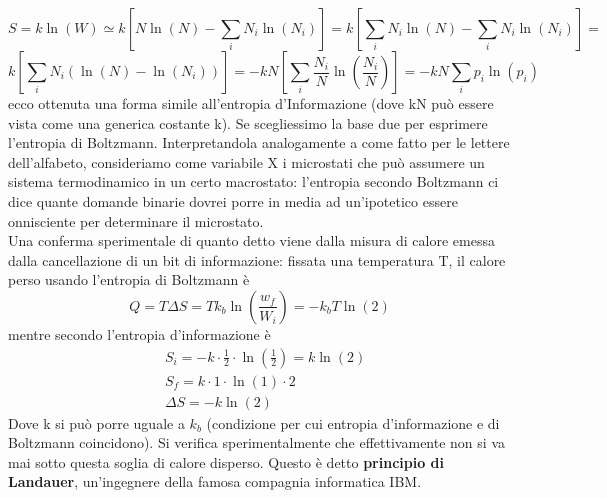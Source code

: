 \documentclass[
10pt, %
a4paper, %
oneside, %
headinclude,footinclude, %
BCOR5mm, %
]{scrartcl}
\begin{document}
\[S = k\ln(W)\simeq k[N\ln(N)-\sum_iN_i\ln(N_i)]=k\left[\sum_iN_i\ln(N)-\sum_iN_i\ln(N_i)\right]=\]
\[k\left[\sum_iN_i\left(\ln(N)-\ln(N_i)\right)\right]=-kN\left[\sum_i\frac{N_i}{N}\ln\left(\frac{N_i}{N}\right)\right] =-kN\sum_ip_i\ln(p_i)\]
ecco ottenuta una forma simile all'entropia d'Informazione (dove kN può essere vista come una generica costante k). Se scegliessimo la base due per esprimere l'entropia di Boltzmann. Interpretandola analogamente a come fatto per le lettere dell'alfabeto, consideriamo come variabile X i microstati che può assumere un sistema termodinamico in un certo macrostato: l'entropia secondo Boltzmann ci dice quante domande binarie dovrei porre in media ad un'ipotetico essere onnisciente per determinare il microstato.\\
 Una conferma sperimentale di quanto detto viene dalla misura di calore emessa dalla cancellazione di un bit di informazione: fissata una temperatura T, il calore perso usando l'entropia di Boltzmann è
\[Q = T\Delta S = T k_b \ln\left(\frac{w_f}{W_i}\right) = -k_bT\ln(2)\]
mentre secondo l'entropia d'informazione è
\begin{align*}
	&S_i =-k\cdot \frac{1}{2}\cdot \ln\left(\frac{1}{2}\right)=k\ln(2)\\
	&S_f=k\cdot 1 \cdot \ln(1)\cdot 2\\
	&\Delta S = -k\ln(2)
\end{align*}
Dove k si può porre uguale a \(k_b\) (condizione per cui entropia d'informazione e di Boltzmann coincidono). Si verifica sperimentalmente che effettivamente non si va mai sotto questa soglia di calore disperso. Questo è detto \textbf{principio di Landauer}, un'ingegnere della famosa compagnia informatica IBM.
\newpage
\appendix
\end{document}
